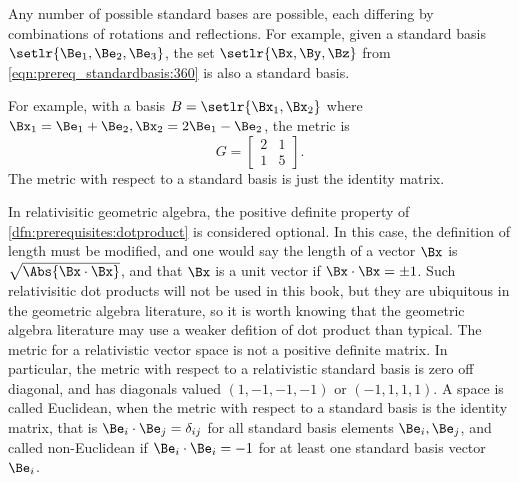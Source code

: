 
Any number of possible standard bases are possible, each differing by combinations of rotations and reflections.  For example, given a standard basis \( \setlr{ \Be_1, \Be_2, \Be_3 } \), the set \( \setlr{\Bx, \By, \Bz} \) from \cref{eqn:prereq_standardbasis:360} is also a standard basis.


For example, with a basis \( B = \setlr{\Bx_1, \Bx_2} \) where \( \Bx_1 = \Be_1 + \Be_2, \Bx_2 = 2 \Be_1 - \Be_2 \), the metric is
\begin{equation}\label{eqn:prereq_standardbasis:400}
G =
\begin{bmatrix}
2 & 1 \\
1 & 5
\end{bmatrix}.
\end{equation}
The metric with respect to a standard basis is just the identity matrix.

In relativisitic geometric algebra, the positive definite property of \cref{dfn:prerequisites:dotproduct} is considered optional.
In this case, the definition of length must be modified, and one would say the length of a vector \( \Bx \) is \( \sqrt{\Abs{\Bx \cdot \Bx}} \), and that \( \Bx \) is a unit vector if \( \Bx \cdot \Bx = \pm 1 \).
Such relativisitic dot products will not be used in this book, but they are ubiquitous in the geometric algebra literature, so
it is worth knowing that the geometric algebra literature may use a weaker defition of dot product than typical.
The metric for a relativistic vector space is not a positive definite matrix.  In particular, the metric with respect to a relativistic standard basis is zero off diagonal, and has
diagonals valued \( (1, -1, -1, -1) \) or \( (-1, 1, 1, 1) \).
A space is called Euclidean, when the metric with respect to a standard basis is the identity matrix, that is
\( \Be_i \cdot \Be_j = \delta_{ij} \) for all standard basis elements \( \Be_i, \Be_j \), and
called non-Euclidean if \( \Be_i \cdot \Be_i = -1 \) for at least one standard basis vector \( \Be_i \).

